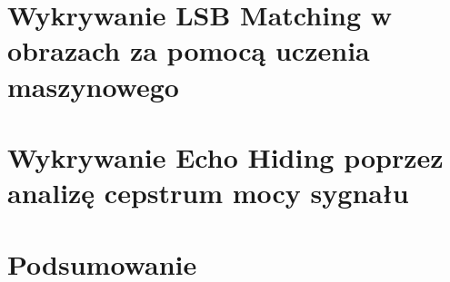 \documentclass[a4paper,12pt]{article}
\begin{document}
\clearpage
\section{Wykrywanie LSB Matching w obrazach za pomocą uczenia maszynowego}


\clearpage
\section{Wykrywanie Echo Hiding poprzez analizę cepstrum mocy sygnału}


\section{Podsumowanie}

\printbibliography[title={Źródła}] %
\end{document}
